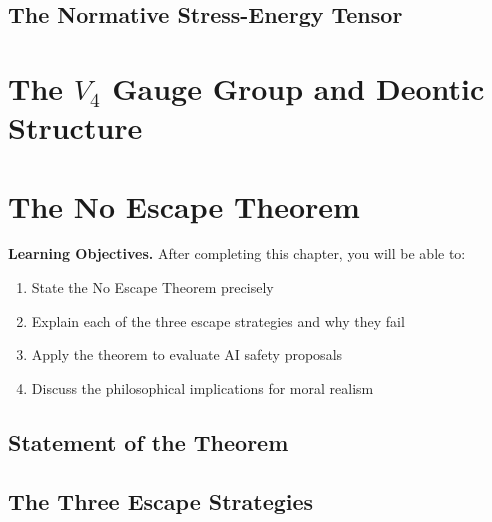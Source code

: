 \documentclass[12pt,letterpaper,twoside,openright]{book}
\theoremstyle{plain}
\theoremstyle{definition}
\theoremstyle{remark}
\begin{document}
\section{The Normative Stress-Energy Tensor}


\chapter{The $V_4$ Gauge Group and Deontic Structure}
\label{ch:d4}



\chapter{The No Escape Theorem}
\label{ch:no-escape}

\begin{framed}
\noindent\textbf{Learning Objectives.} After completing this chapter, you will be able to:
\begin{enumerate}
    \item State the No Escape Theorem precisely
    \item Explain each of the three escape strategies and why they fail
    \item Apply the theorem to evaluate AI safety proposals
    \item Discuss the philosophical implications for moral realism
\end{enumerate}
\end{framed}

\section{Statement of the Theorem}

\section{The Three Escape Strategies}
\end{document}
